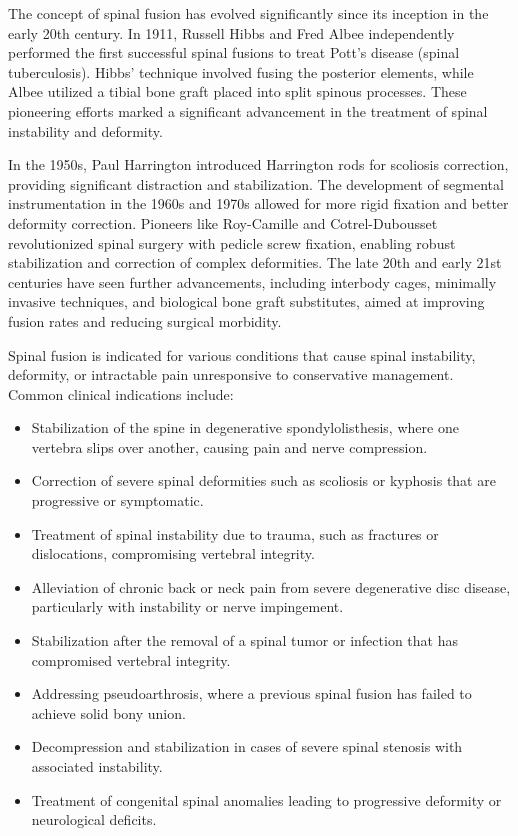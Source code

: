 The concept of spinal fusion has evolved significantly since its inception in the early 20th century. In 1911, Russell Hibbs and Fred Albee independently performed the first successful spinal fusions to treat Pott's disease (spinal tuberculosis). Hibbs' technique involved fusing the posterior elements, while Albee utilized a tibial bone graft placed into split spinous processes. These pioneering efforts marked a significant advancement in the treatment of spinal instability and deformity.

In the 1950s, Paul Harrington introduced Harrington rods for scoliosis correction, providing significant distraction and stabilization. The development of segmental instrumentation in the 1960s and 1970s allowed for more rigid fixation and better deformity correction. Pioneers like Roy-Camille and Cotrel-Dubousset revolutionized spinal surgery with pedicle screw fixation, enabling robust stabilization and correction of complex deformities. The late 20th and early 21st centuries have seen further advancements, including interbody cages, minimally invasive techniques, and biological bone graft substitutes, aimed at improving fusion rates and reducing surgical morbidity.

Spinal fusion is indicated for various conditions that cause spinal instability, deformity, or intractable pain unresponsive to conservative management. Common clinical indications include:

\begin{itemize}
  \item Stabilization of the spine in degenerative spondylolisthesis, where one vertebra slips over another, causing pain and nerve compression.
  \item Correction of severe spinal deformities such as scoliosis or kyphosis that are progressive or symptomatic.
  \item Treatment of spinal instability due to trauma, such as fractures or dislocations, compromising vertebral integrity.
  \item Alleviation of chronic back or neck pain from severe degenerative disc disease, particularly with instability or nerve impingement.
  \item Stabilization after the removal of a spinal tumor or infection that has compromised vertebral integrity.
  \item Addressing pseudoarthrosis, where a previous spinal fusion has failed to achieve solid bony union.
  \item Decompression and stabilization in cases of severe spinal stenosis with associated instability.
  \item Treatment of congenital spinal anomalies leading to progressive deformity or neurological deficits.
\end{itemize}

